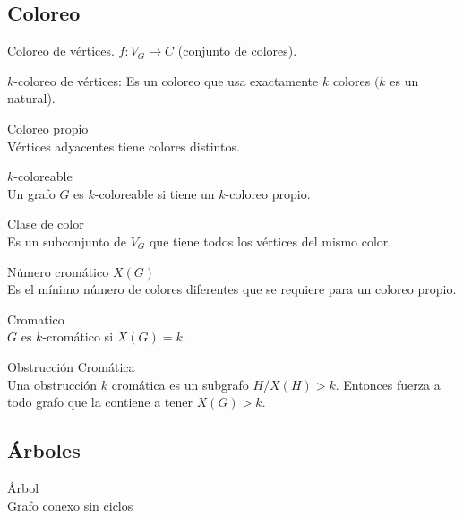 \documentclass{article}
\begin{document}
\subsection{Coloreo}
Coloreo de vértices. $f: V_{G} \rightarrow C$ (conjunto de colores).

\begin{defn}
$k$-coloreo de vértices: Es un coloreo que usa exactamente $k$ colores $(k$ es un natural).
\end{defn}

\begin{defn}
Coloreo propio \\ Vértices adyacentes tiene colores distintos.
\end{defn}

\begin{defn}
$k$-coloreable \\ Un grafo $G$ es $k$-coloreable si tiene un $k$-coloreo propio.
\end{defn}

\begin{defn}
Clase de color \\ Es un subconjunto de $V_{G}$ que tiene todos los vértices del mismo color.
\end{defn}

\begin{defn}
Número cromático $X(G)$ \\ Es el mínimo número de colores diferentes que se requiere para un coloreo propio.
\end{defn}

\begin{defn}
Cromatico \\ $G$ es $k$-cromático si $X(G)=k$.
\end{defn}

\begin{defn}
Obstrucción Cromática \\ Una obstrucción $k$ cromática es un subgrafo $H / X(H)>k$. Entonces fuerza a todo grafo que la contiene a tener $X(G)>k$.
\end{defn}

\subsection{Árboles}

\begin{defn}
Árbol \\ Grafo conexo sin ciclos
\end{defn}
\end{document}
